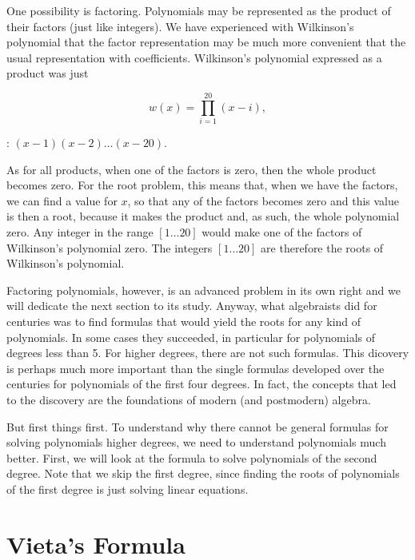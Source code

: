 \documentclass[tikz]{scrreprt}
\begin{document}
One possibility is factoring.
Polynomials may be represented as the product
of their factors (just like integers).
We have experienced with Wilkinson's polynomial
that the factor representation may be much more
convenient that the usual representation with
coefficients. Wilkinson's polynomial expressed
as a product was just

\begin{equation}
w(x) = \prod_{i=1}^{20}{(x-i)},
\end{equation}

\ie: $(x-1)(x-2)\dots (x-20)$.

As for all products, when one of the factors
is zero, then the whole product becomes zero.
For the root problem, this means that, 
when we have the factors, we can find a value
for $x$, so that any of the factors becomes zero
and this value is then a root, because it makes
the product and, as such, the whole polynomial zero.
Any integer in the range $[1\dots 20]$ would make
one of the factors of Wilkinson's polynomial zero.
The integers $[1\dots 20]$ are therefore the roots
of Wilkinson's polynomial.

Factoring polynomials, however, is an advanced
problem in its own right and we will dedicate
the next section to its study. Anyway, what
algebraists did for centuries was to find
formulas that would yield the roots for any kind
of polynomials. In some cases they succeeded,
in particular for polynomials of degrees less
than 5. For higher degrees, there are not such
formulas. This dicovery is perhaps much more
important than the single formulas developed
over the centuries for polynomials of the first
four degrees. In fact, the concepts that led
to the discovery are the foundations of modern
(and postmodern) algebra. 

But first things first. To understand why there
cannot be general formulas for solving polynomials
higher degrees, we need to understand polynomials
much better. First, we will look at the formula
to solve polynomials of the second degree.
Note that we skip the first degree, since 
finding the roots of polynomials
of the first degree is just solving linear
equations.
\section{Vieta's Formula}
\end{document}
